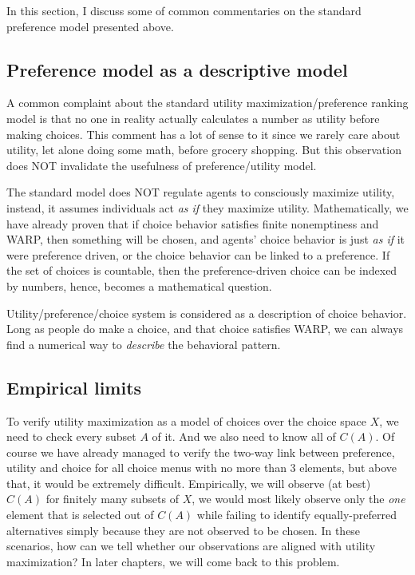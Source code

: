 In this section, I discuss some of common commentaries on the standard preference model presented above.

\subsection{Preference model as a descriptive model}
A common complaint about the standard utility maximization/preference ranking model is that no one in reality actually calculates a number as utility before making choices.
This comment has a lot of sense to it since we rarely care about utility, let alone doing some math, before grocery shopping. But this observation does NOT invalidate the 
usefulness of preference/utility model.

The standard model does NOT regulate agents to consciously maximize utility, instead, it assumes individuals act \textit{as if} they maximize utility. Mathematically, we have already
proven that if choice behavior satisfies finite nonemptiness and WARP, then something will be chosen, and agents' choice behavior is just \textit{as if} it were preference driven, or the choice
behavior can be linked to a preference. If the set of choices is countable, then the preference-driven choice can be indexed by numbers, hence, becomes a mathematical question.

Utility/preference/choice system is considered as a description of choice behavior. Long as people do make a choice, and that choice satisfies WARP, we can always find a numerical way to 
\textit{describe} the behavioral pattern.

\subsection{Empirical limits}
To verify utility maximization as a model of choices over the choice space $X$, we need to check every subset $A$ of it. And we also need to know all of $C(A)$. Of course we have already managed to verify the two-way link between
preference, utility and choice for all choice menus with no more than 3 elements, but above that, it would be extremely difficult. Empirically, we will observe (at best) $C(A)$ for finitely many subsets of $X$, we would most likely
observe only the \textit{one} element that is selected out of $C(A)$ while failing to identify equally-preferred alternatives simply because they are not observed to be chosen. In these scenarios, how can we tell whether our observations
are aligned with utility maximization? In later chapters, we will come back to this problem.

